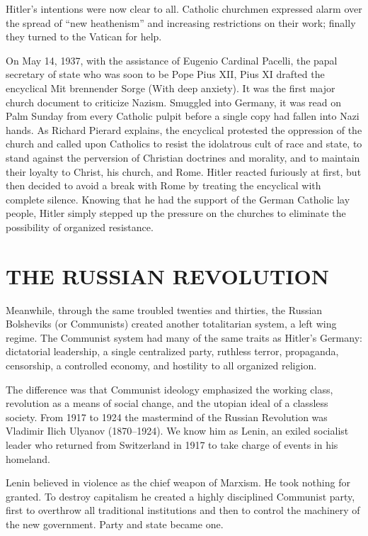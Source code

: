 Hitler’s intentions were now clear to all. Catholic churchmen expressed alarm over the spread of
“new heathenism” and increasing restrictions on their work; finally they turned to the Vatican for
help.

On May 14, 1937, with the assistance of Eugenio Cardinal Pacelli, the papal secretary of state who
was soon to be Pope Pius XII, Pius XI drafted the encyclical Mit brennender Sorge (With deep
anxiety). It was the first major church document to criticize Nazism. Smuggled into Germany, it was
read on Palm Sunday from every Catholic pulpit before a single copy had fallen into Nazi hands. As
Richard Pierard explains, the encyclical protested the oppression of the church and called upon
Catholics to resist the idolatrous cult of race and state, to stand against the perversion of
Christian doctrines and morality, and to maintain their loyalty to Christ, his church, and Rome.
Hitler reacted furiously at first, but then decided to avoid a break with Rome by treating the
encyclical with complete silence. Knowing that he had the support of the German Catholic lay people,
Hitler simply stepped up the pressure on the churches to eliminate the possibility of organized
resistance.

\section{THE RUSSIAN REVOLUTION}

Meanwhile, through the same troubled twenties and thirties, the Russian Bolsheviks (or Communists)
created another totalitarian system, a left wing regime. The Communist system had many of the same
traits as Hitler’s Germany: dictatorial leadership, a single centralized party, ruthless terror,
propaganda, censorship, a controlled economy, and hostility to all organized religion.

The difference was that Communist ideology emphasized the working class, revolution as a means of
social change, and the utopian ideal of a classless society. From 1917 to 1924 the mastermind of the
Russian Revolution was Vladimir Ilich Ulyanov (1870–1924). We know him as Lenin, an exiled socialist
leader who returned from Switzerland in 1917 to take charge of events in his homeland.

Lenin believed in violence as the chief weapon of Marxism. He took nothing for granted. To destroy
capitalism he created a highly disciplined Communist party, first to overthrow all traditional
institutions and then to control the machinery of the new government. Party and state became one.

